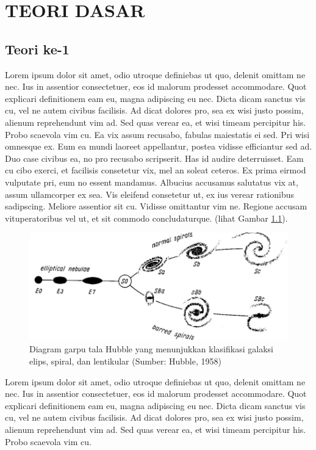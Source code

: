 \chapter{TEORI DASAR}
\vspace{1.0cm}

\section{Teori ke-1}
Lorem ipsum dolor sit amet, odio utroque definiebas ut quo, delenit omittam ne nec. Ius in assentior consectetuer, eos id malorum prodesset accommodare. Quot explicari definitionem eam eu, magna adipiscing eu nec. Dicta dicam sanctus vis cu, vel ne autem civibus facilisis. Ad dicat dolores pro, sea ex wisi justo possim, alienum reprehendunt vim ad. Sed quas verear ea, et wisi timeam percipitur his. Probo scaevola vim cu. Ea vix assum recusabo, fabulas maiestatis ei sed. Pri wisi omnesque ex. Eum ea mundi laoreet appellantur, postea vidisse efficiantur sed ad. Duo case civibus ea, no pro recusabo scripserit. Has id audire deterruisset. Eam cu cibo exerci, et facilisis consetetur vix, mel an soleat ceteros. Ex prima eirmod vulputate pri, eum no essent mandamus. Albucius accusamus salutatus vix at, assum ullamcorper ex sea. Vis eleifend consetetur ut, ex ius verear rationibus sadipscing. Meliore assentior sit cu. Vidisse omittantur vim ne. Regione accusam vituperatoribus vel ut, et sit commodo concludaturque. (lihat Gambar \ref{fig:garputala}). \\
\begin{figure}[H] 
\includegraphics[scale=0.45]{pics/garputala.png}
\caption[Diagram garpu tala Hubble]{Diagram garpu tala Hubble yang menunjukkan klasifikasi galaksi elips, spiral, dan lentikular (Sumber: Hubble, 1958)}
\label{fig:garputala}
\centering
\end{figure}
	Lorem ipsum dolor sit amet, odio utroque definiebas ut quo, delenit omittam ne nec. Ius in assentior consectetuer, eos id malorum prodesset accommodare. Quot explicari definitionem eam eu, magna adipiscing eu nec. Dicta dicam sanctus vis cu, vel ne autem civibus facilisis. Ad dicat dolores pro, sea ex wisi justo possim, alienum reprehendunt vim ad. Sed quas verear ea, et wisi timeam percipitur his. Probo scaevola vim cu.\\
	
